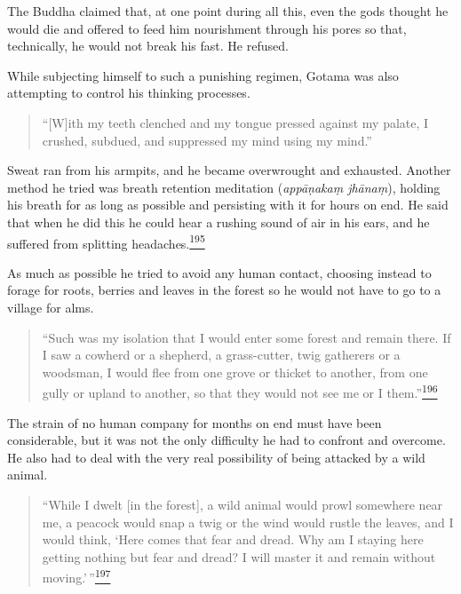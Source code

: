 The Buddha claimed that, at one point during all this, even the gods
thought he would die and offered to feed him nourishment through his
pores so that, technically, he would not break his fast. He refused.

While subjecting himself to such a punishing regimen, Gotama was also
attempting to control his thinking processes.

\begin{quote}
``{[}W{]}ith my teeth clenched and my tongue pressed against my palate,
I crushed, subdued, and suppressed my mind using my mind.''
\end{quote}

Sweat ran from his armpits, and he became overwrought and exhausted.
Another method he tried was breath retention meditation (\emph{appāṇakaṃ
jhānaṃ}), holding his breath for as long as possible and persisting with
it for hours on end. He said that when he did this he could hear a
rushing sound of air in his ears, and he suffered from splitting
headaches.\label{footprints_split_009.html_fnref195}\hyperref[footprints_split_024.htmlux5cux23fn195]{\textsuperscript{195}}

As much as possible he tried to avoid any human contact, choosing
instead to forage for roots, berries and leaves in the forest so he
would not have to go to a village for alms.

\begin{quote}
``Such was my isolation that I would enter some forest and remain there.
If I saw a cowherd or a shepherd, a grass-cutter, twig gatherers or a
woodsman, I would flee from one grove or thicket to another, from one
gully or upland to another, so that they would not see me or I
them.''\label{footprints_split_009.html_fnref196}\hyperref[footprints_split_024.htmlux5cux23fn196]{\textsuperscript{196}}
\end{quote}

The strain of no human company for months on end must have been
considerable, but it was not the only difficulty he had to confront and
overcome. He also had to deal with the very real possibility of being
attacked by a wild animal.

\begin{quote}
``While I dwelt {[}in the forest{]}, a wild animal would prowl somewhere
near me, a peacock would snap a twig or the wind would rustle the
leaves, and I would think, `Here comes that fear and dread. Why am I
staying here getting nothing but fear and dread? I will master it and
remain without
moving.'\,''\label{footprints_split_009.html_fnref197}\hyperref[footprints_split_024.htmlux5cux23fn197]{\textsuperscript{197}}
\end{quote}

